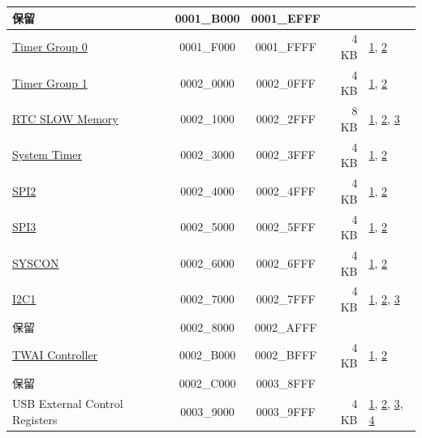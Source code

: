 \begin{longtable}[c]{ |p{5.0cm}|c|c|r|p{1.5cm}| }
    \rowcolor{gray!25}
  保留   & \hexprefix{}0001\_B000 & \hexprefix{}0001\_EFFF &        &            \\\hline
               \hyperref[mod:timg]{Timer Group 0}     & \hexprefix{}0001\_F000 & \hexprefix{}0001\_FFFF &   4 KB    & \hyperref[PAM footnote: 1]{1}, \hyperref[PAM footnote: 2]{2}     \\\hline

              \hyperref[mod:timg]{Timer Group 1}     & \hexprefix{}0002\_0000 & \hexprefix{}0002\_0FFF &   4 KB & \hyperref[PAM footnote: 1]{1}, \hyperref[PAM footnote: 2]{2}     \\\hline
              \hyperref[mod:lowpowm]{RTC SLOW Memory}     & \hexprefix{}0002\_1000 & \hexprefix{}0002\_2FFF &   8 KB   & \hyperref[PAM footnote: 1]{1}, \hyperref[PAM footnote: 2]{2}, \hyperref[PAM footnote: 3]{3}  \\\hline
               \hyperref[mod:systimer]{System Timer}    & \hexprefix{}0002\_3000 & \hexprefix{}0002\_3FFF &   4 KB   & \hyperref[PAM footnote: 1]{1}, \hyperref[PAM footnote: 2]{2}     \\\hline
               \hyperref[mod:spi]{SPI2}    & \hexprefix{}0002\_4000 & \hexprefix{}0002\_4FFF &   4 KB   & \hyperref[PAM footnote: 1]{1}, \hyperref[PAM footnote: 2]{2}     \\\hline
                \hyperref[mod:spi]{SPI3}   & \hexprefix{}0002\_5000 & \hexprefix{}0002\_5FFF &   4 KB   & \hyperref[PAM footnote: 1]{1}, \hyperref[PAM footnote: 2]{2}     \\\hline
                \hyperref[mod:permctrl]{SYSCON}   & \hexprefix{}0002\_6000 & \hexprefix{}0002\_6FFF &   4 KB    & \hyperref[PAM footnote: 1]{1}, \hyperref[PAM footnote: 2]{2}     \\\hline
                \hyperref[mod:i2c]{I2C1}   & \hexprefix{}0002\_7000 & \hexprefix{}0002\_7FFF &   4 KB  & \hyperref[PAM footnote: 1]{1}, \hyperref[PAM footnote: 2]{2}, \hyperref[PAM footnote: 3]{3}  \\\hline

    \rowcolor{gray!25}
  保留  & \hexprefix{}0002\_8000 & \hexprefix{}0002\_AFFF &        &              \\\hline
              \hyperref[mod:twai]{TWAI Controller}      & \hexprefix{}0002\_B000 & \hexprefix{}0002\_BFFF &   4 KB  & \hyperref[PAM footnote: 1]{1}, \hyperref[PAM footnote: 2]{2}     \\\hline

    \rowcolor{gray!25}
   保留 & \hexprefix{}0002\_C000 & \hexprefix{}0003\_8FFF &        &                      \\\hline
               USB External Control Registers   & \hexprefix{}0003\_9000 & \hexprefix{}0003\_9FFF &   4 KB    & \hyperref[PAM footnote: 1]{1}, \hyperref[PAM footnote: 2]{2}, \hyperref[PAM footnote: 3]{3}, \hyperref[PAM footnote: 4]{4}     \\\hline


\end{longtable}
